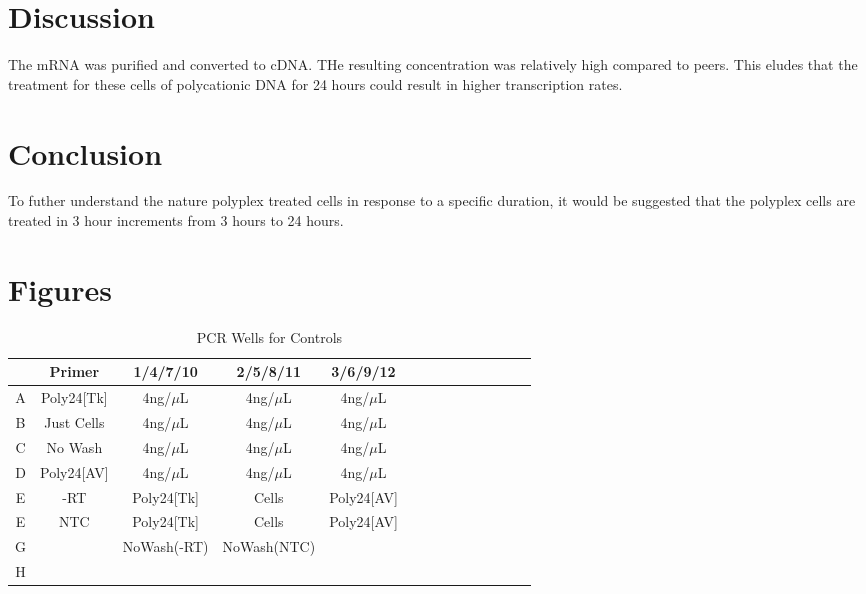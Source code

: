\documentclass[journal, a4paper]{IEEEtran}
\begin{document}
\section{Discussion}

The mRNA was purified and converted to cDNA. THe resulting concentration was relatively high compared to peers. This eludes that the
treatment for these cells of polycationic DNA for 24 hours could result in higher transcription rates.

\section{Conclusion}

To futher understand the nature polyplex treated cells in response to a specific duration,
it would be suggested that the polyplex cells are treated in 3 hour increments from 3 hours to 24 hours.


\section{Figures}

  \begin{table}[!hbt]
    \begin{center}
    \caption{PCR Wells for Controls}
    \label{tab:simParameters}
    \begin{tabular}{|c|c|c|c|c|c|c|c|c|c|c|c|c|c|}
      \hline
      & Primer & 1/4/7/10 & 2/5/8/11 & 3/6/9/12 \\
      \hline
      A & Poly24[Tk] & 4ng/$\mu$L & 4ng/$\mu$L & 4ng/$\mu$L\\
      \hline
      B & Just Cells & 4ng/$\mu$L & 4ng/$\mu$L & 4ng/$\mu$L\\
      \hline
      C & No Wash & 4ng/$\mu$L & 4ng/$\mu$L & 4ng/$\mu$L\\
      \hline
      D & Poly24[AV] & 4ng/$\mu$L & 4ng/$\mu$L & 4ng/$\mu$L\\
      \hline
      E & -RT & Poly24[Tk] & Cells & Poly24[AV] \\
      \hline
      E & NTC & Poly24[Tk] & Cells & Poly24[AV] \\
      \hline
      G & & NoWash(-RT) & NoWash(NTC) &\\
      \hline
      H & & & &\\
      \hline
    \end{tabular}
    \end{center}
  \end{table}
\end{document}
